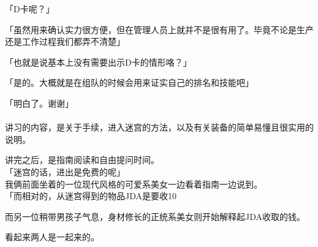「D卡呢？」

「虽然用来确认实力很方便，但在管理人员上就并不是很有用了。毕竟不论是生产还是工作过程我们都弄不清楚」

「也就是说基本上没有需要出示D卡的情形咯？」

「是的。大概就是在组队的时候会用来证实自己的排名和技能吧」

「明白了。谢谢」\\

\sqsplit\\

讲习的内容，是关于手续，进入迷宫的方法，以及有关装备的简单易懂且很实用的说明。

讲完之后，是指南阅读和自由提问时间。\\

「迷宫的话，进出是免费的呢」\\

我俩前面坐着的一位现代风格的可爱系美女一边看着指南一边说到。\\

「而相对的，从迷宫得到的物品JDA是要收10%

而另一位稍带男孩子气息，身材修长的正统系美女则开始解释起JDA收取的钱。

看起来两人是一起来的。\\


